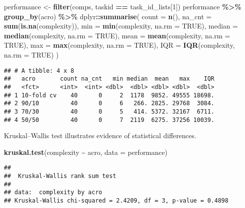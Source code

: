 \documentclass[
]{book}
\newenvironment{Shaded}{\begin{snugshade}}{\end{snugshade}}
\newcommand{\AttributeTok}[1]{\textcolor[rgb]{0.13,0.29,0.53}{#1}}
\newcommand{\ConstantTok}[1]{\textcolor[rgb]{0.56,0.35,0.01}{#1}}
\newcommand{\DecValTok}[1]{\textcolor[rgb]{0.00,0.00,0.81}{#1}}
\newcommand{\FunctionTok}[1]{\textcolor[rgb]{0.13,0.29,0.53}{\textbf{#1}}}
\newcommand{\NormalTok}[1]{#1}
\newcommand{\OtherTok}[1]{\textcolor[rgb]{0.56,0.35,0.01}{#1}}
\newcommand{\SpecialCharTok}[1]{\textcolor[rgb]{0.81,0.36,0.00}{\textbf{#1}}}
\begin{document}
\begin{Shaded}
\begin{Highlighting}[]
\NormalTok{performance }\OtherTok{\textless{}{-}} \FunctionTok{filter}\NormalTok{(comps, taskid }\SpecialCharTok{==}\NormalTok{ task\_id\_lists[}\DecValTok{1}\NormalTok{])}
\NormalTok{performance }\SpecialCharTok{\%\textgreater{}\%}
  \FunctionTok{group\_by}\NormalTok{(acro) }\SpecialCharTok{\%\textgreater{}\%}
\NormalTok{  dplyr}\SpecialCharTok{::}\FunctionTok{summarise}\NormalTok{(}
    \AttributeTok{count =} \FunctionTok{n}\NormalTok{(),}
    \AttributeTok{na\_cnt =} \FunctionTok{sum}\NormalTok{(}\FunctionTok{is.na}\NormalTok{(complexity)),}
    \AttributeTok{min =} \FunctionTok{min}\NormalTok{(complexity, }\AttributeTok{na.rm =} \ConstantTok{TRUE}\NormalTok{),}
    \AttributeTok{median =} \FunctionTok{median}\NormalTok{(complexity, }\AttributeTok{na.rm =} \ConstantTok{TRUE}\NormalTok{),}
    \AttributeTok{mean =} \FunctionTok{mean}\NormalTok{(complexity, }\AttributeTok{na.rm =} \ConstantTok{TRUE}\NormalTok{),}
    \AttributeTok{max =} \FunctionTok{max}\NormalTok{(complexity, }\AttributeTok{na.rm =} \ConstantTok{TRUE}\NormalTok{),}
    \AttributeTok{IQR =} \FunctionTok{IQR}\NormalTok{(complexity, }\AttributeTok{na.rm =} \ConstantTok{TRUE}\NormalTok{)}
\NormalTok{  )}
\end{Highlighting}
\end{Shaded}

\begin{verbatim}
## # A tibble: 4 x 8
##   acro       count na_cnt   min median  mean   max    IQR
##   <fct>      <int>  <int> <dbl>  <dbl> <dbl> <dbl>  <dbl>
## 1 10-fold cv    40      0     2  1178  9852. 49555 18698.
## 2 90/10         40      0     6   266. 2825. 29768  3084.
## 3 70/30         40      0     5   414. 5372. 32167  6711.
## 4 50/50         40      0     7  2119  6275. 37256 10039.
\end{verbatim}

Kruskal--Wallis test illustrates evidence of statistical differences.

\begin{Shaded}
\begin{Highlighting}[]
\FunctionTok{kruskal.test}\NormalTok{(complexity }\SpecialCharTok{\textasciitilde{}}\NormalTok{ acro, }\AttributeTok{data =}\NormalTok{ performance)}
\end{Highlighting}
\end{Shaded}

\begin{verbatim}
## 
##  Kruskal-Wallis rank sum test
## 
## data:  complexity by acro
## Kruskal-Wallis chi-squared = 2.4209, df = 3, p-value = 0.4898
\end{verbatim}
\end{document}
